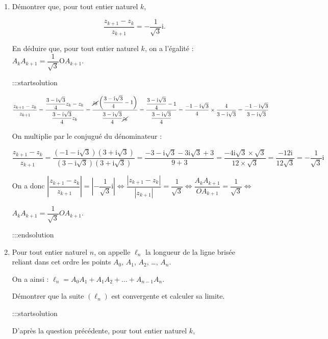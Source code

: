 \documentclass{cornouaille}
\begin{document}
\begin{enumerate}
\begin{enumerate}
\item Démontrer que, pour tout entier naturel $k$,


$$
\dfrac{z_{k+1} - z_{k}}{z_{k+1}} = - \dfrac{1}{\sqrt{3}}\text{i}.
$$


En déduire que, pour tout entier naturel $k$, on a l'égalité : $A_kA_{k+1} = \dfrac{1}{\sqrt{3}} \text{O}A_{k+1}$.


:::startsolution

$\dfrac{z_{k+1} - z_k}{z_{k+1} } = \dfrac{ \dfrac{3-\text{i}\sqrt{3}}{4}z_k - z_k}{ \dfrac{3-\text{i}\sqrt{3}}{4}z_k } = \dfrac{ \cancel{z_k} \left( \dfrac{3-\text{i}\sqrt{3}}{4} - 1 \right)}{ \dfrac{3-\text{i}\sqrt{3}}{4}\cancel{z_k} }
=\dfrac{ \dfrac{3-\text{i}\sqrt{3}}{4} - 1 }{\dfrac{3-\text{i}\sqrt{3}}{4}}
= \dfrac{ -1-\text{i}\sqrt{3} }{4} \times \dfrac{4}{3-\text{i}\sqrt{3}}
= \dfrac{ -1-\text{i}\sqrt{3} }{3-\text{i}\sqrt{3}}$\medskip

On multiplie par le conjugué du dénominateur :\smallskip

$\dfrac{z_{k+1} - z_k}{z_{k+1}}
=\dfrac{ (-1-\text{i}\sqrt{3})(3+\text{i}\sqrt{3}) }{ (3-\text{i}\sqrt{3})(3+\text{i}\sqrt{3})}
= \dfrac{-3-\text{i}\sqrt{3}-3\text{i}\sqrt{3}+3 }{9+3} = \dfrac{-4\text{i}\sqrt{3}\times \sqrt{3} }{12 \times \sqrt{3} } = \dfrac{-12\text{i}}{12\sqrt{3}} = - \dfrac{1}{\sqrt{3}} \text{i}$\medskip

On a donc $\left|\dfrac{z_{k+1} - z_k}{z_{k+1} }\right| = \left|- \dfrac{1}{\sqrt{3}} \text{i}\right|
\iff \dfrac{\left|z_{k+1} - z_k \right|}{\left|z_{k+1} \right|} = \dfrac{1}{\sqrt{3}}
\iff \dfrac{A_kA_{k+1}}{OA_{k+1}} = \dfrac{1}{\sqrt{3}}
\iff $

$A_kA_{k+1} = \dfrac{1}{\sqrt{3}} OA_{k+1}$.


:::endsolution
\item Pour tout entier naturel $n$, on appelle $\ell_n$ la longueur de la ligne brisée reliant dans cet ordre les points $A_0$,\: $A_1$,\: $A_2$, \ldots , $A_n$.

On a ainsi : $\ell_n = A_0A_1 + A_1A_2 + \ldots + A_{n-1}A_n$.

Démontrer que la suite $\left(\ell_n\right)$ est convergente et calculer sa limite.


:::startsolution

D'après la question précédente, pour tout entier naturel $k$,\smallskip


\end{enumerate}
\end{enumerate}
\end{document}
